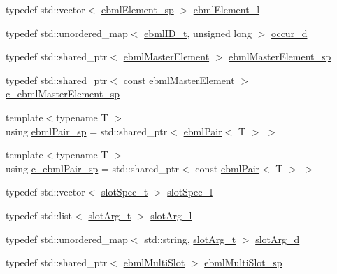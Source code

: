 \begin{DoxyCompactItemize}
\item 
typedef std\+::vector$<$ \mbox{\hyperlink{namespaceebml_adad533b7705a16bb360fe56380c5e7be}{ebml\+Element\+\_\+sp}} $>$ \mbox{\hyperlink{namespaceebml_a1ddadd26791f273d851882653b9caf70}{ebml\+Element\+\_\+l}}
\item 
typedef std\+::unordered\+\_\+map$<$ \mbox{\hyperlink{namespaceebml_a86c5f604ddf12a74aa9812e997a58691}{ebml\+I\+D\+\_\+t}}, unsigned long $>$ \mbox{\hyperlink{namespaceebml_a4ecb956f78f49ef5e24e0d0db9b646f4}{occur\+\_\+d}}
\item 
typedef std\+::shared\+\_\+ptr$<$ \mbox{\hyperlink{classebml_1_1ebmlMasterElement}{ebml\+Master\+Element}} $>$ \mbox{\hyperlink{namespaceebml_af0dd39c01f0391f27971528001c1dc0e}{ebml\+Master\+Element\+\_\+sp}}
\item 
typedef std\+::shared\+\_\+ptr$<$ const \mbox{\hyperlink{classebml_1_1ebmlMasterElement}{ebml\+Master\+Element}} $>$ \mbox{\hyperlink{namespaceebml_a7a62721c59c06de6cadf348c51eabe1c}{c\+\_\+ebml\+Master\+Element\+\_\+sp}}
\item 
{\footnotesize template$<$typename T $>$ }\\using \mbox{\hyperlink{namespaceebml_a15439f6031c0f4ced33b9ab5e28af120}{ebml\+Pair\+\_\+sp}} = std\+::shared\+\_\+ptr$<$ \mbox{\hyperlink{classebml_1_1ebmlPair}{ebml\+Pair}}$<$ T $>$ $>$
\item 
{\footnotesize template$<$typename T $>$ }\\using \mbox{\hyperlink{namespaceebml_a9c804317d5b51ef8844bdffe5e8cb4b3}{c\+\_\+ebml\+Pair\+\_\+sp}} = std\+::shared\+\_\+ptr$<$ const \mbox{\hyperlink{classebml_1_1ebmlPair}{ebml\+Pair}}$<$ T $>$ $>$
\item 
typedef std\+::vector$<$ \mbox{\hyperlink{classebml_1_1slotSpec__t}{slot\+Spec\+\_\+t}} $>$ \mbox{\hyperlink{namespaceebml_abdc1248164e4e424423defac9fff7d4d}{slot\+Spec\+\_\+l}}
\item 
typedef std\+::list$<$ \mbox{\hyperlink{classebml_1_1slotArg__t}{slot\+Arg\+\_\+t}} $>$ \mbox{\hyperlink{namespaceebml_ae432575dfbb3e141ce897442794f0ca5}{slot\+Arg\+\_\+l}}
\item 
typedef std\+::unordered\+\_\+map$<$ std\+::string, \mbox{\hyperlink{classebml_1_1slotArg__t}{slot\+Arg\+\_\+t}} $>$ \mbox{\hyperlink{namespaceebml_a4317d4c495715eced3ed448c2d05caeb}{slot\+Arg\+\_\+d}}
\item 
typedef std\+::shared\+\_\+ptr$<$ \mbox{\hyperlink{classebml_1_1ebmlMultiSlot}{ebml\+Multi\+Slot}} $>$ \mbox{\hyperlink{namespaceebml_a1e633eb51fcbe25caf953fd159171543}{ebml\+Multi\+Slot\+\_\+sp}}

\end{DoxyCompactItemize}
